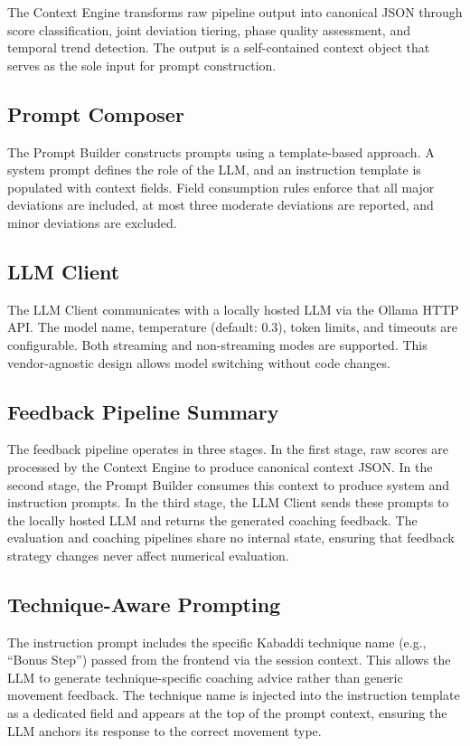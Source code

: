 The Context Engine transforms raw pipeline output into canonical JSON through score classification, joint deviation tiering, phase quality assessment, and temporal trend detection. The output is a self-contained context object that serves as the sole input for prompt construction.


\subsection{Prompt Composer}

The Prompt Builder constructs prompts using a template-based approach. A system prompt defines the role of the LLM, and an instruction template is populated with context fields. Field consumption rules enforce that all major deviations are included, at most three moderate deviations are reported, and minor deviations are excluded.


\subsection{LLM Client}

The LLM Client communicates with a locally hosted LLM via the Ollama HTTP API. The model name, temperature (default: 0.3), token limits, and timeouts are configurable. Both streaming and non-streaming modes are supported. This vendor-agnostic design allows model switching without code changes.


\subsection{Feedback Pipeline Summary}

The feedback pipeline operates in three stages. In the first stage, raw scores are processed by the Context Engine to produce canonical context JSON. In the second stage, the Prompt Builder consumes this context to produce system and instruction prompts. In the third stage, the LLM Client sends these prompts to the locally hosted LLM and returns the generated coaching feedback. The evaluation and coaching pipelines share no internal state, ensuring that feedback strategy changes never affect numerical evaluation.


\subsection{Technique-Aware Prompting}

The instruction prompt includes the specific Kabaddi technique name (e.g., ``Bonus Step'') passed from the frontend via the session context. This allows the LLM to generate technique-specific coaching advice rather than generic movement feedback. The technique name is injected into the instruction template as a dedicated field and appears at the top of the prompt context, ensuring the LLM anchors its response to the correct movement type.



